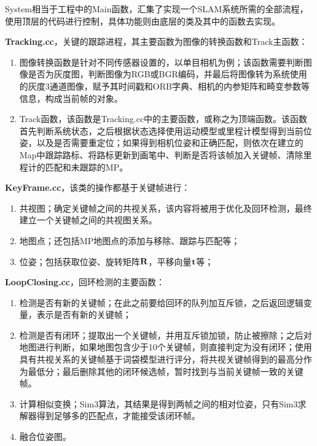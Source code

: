 System相当于工程中的Main函数，汇集了实现一个SLAM系统所需的全部流程，使用顶层的代码进行控制，具体功能则由底层的类及其中的函数去实现。

\textbf{Tracking.cc}，关键的跟踪进程，其主要函数为图像的转换函数和Track主函数：
\begin{enumerate}
	\item 
	图像转换函数是针对不同传感器设置的，以单目相机为例；该函数需要判断图像是否为灰度图，判断图像为RGB或BGR编码，并最后将图像转为系统使用的灰度3通道图像，赋予其时间戳和ORB字典、相机的内参矩阵和畸变参数等信息，构成当前帧的对象。
	\item 
	Track函数，该函数是Tracking.cc中的主要函数，或称之为顶端函数。该函数首先判断系统状态，之后根据状态选择使用运动模型或里程计模型得到当前位姿，以及是否需要重定位；如果得到相机位姿和正确匹配，则依次在建立的Map中跟踪路标、将路标更新到画笔中、判断是否将该帧加入关键帧、清除里程计的匹配和未跟踪的MP。
\end{enumerate}

\textbf{KeyFrame.cc}，该类的操作都基于关键帧进行：

\begin{enumerate}
	\item 
	共视图；确定关键帧之间的共视关系，该内容将被用于优化及回环检测，最终建立一个关键帧之间的共视图关系。
	\item 
	地图点；还包括MP地图点的添加与移除、跟踪与匹配等；
	\item 
	位姿；包括获取位姿、旋转矩阵$\bf{R}$，平移向量$\bf{t}$等；
\end{enumerate}

\textbf{LoopClosing.cc}，回环检测的主要函数：

\begin{enumerate}
	\item 检测是否有新的关键帧；在此之前要给回环的队列加互斥锁，之后返回逻辑变量，表示是否有新的关键帧；
	\item 检测是否有闭环；提取出一个关键帧，并用互斥锁加锁，防止被擦除；之后对地图进行判断，如果地图包含少于10个关键帧，则直接判定为没有闭环；使用具有共视关系的关键帧基于词袋模型进行评分，将共视关键帧得到的最高分作为最低分；最后删除其他的闭环候选帧，暂时找到与当前关键帧一致的关键帧。
	\item 计算相似变换；Sim3算法，其结果是得到两帧之间的相对位姿，只有Sim3求解器得到足够多的匹配点，才能接受该闭环帧。
	\item 融合位姿图。
\end{enumerate}




